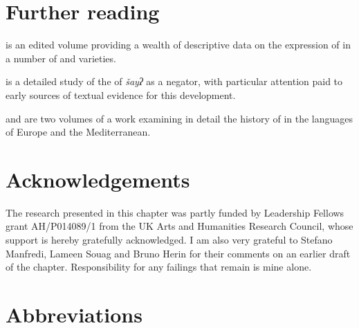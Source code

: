 \documentclass[output=paper]{langsci/langscibook}
\begin{document}
\section*{Further reading}
\begin{furtherreading}
\item[\citet{ChakerCaubet1996}] is an edited volume providing a wealth of descriptive data on the expression of  in a number of  and   varieties.
\item[\citet{Diem2014}] is a detailed study of the  of  \textit{šayʔ} as a negator, with particular attention paid to early sources of textual evidence for this development.
\item[\citet{WillisBreitbarth2013}] and \citet{BreitbarthWillisLucasinpress} are two volumes of a work examining in detail the history of  in the languages of Europe and the Mediterranean.
\end{furtherreading}

\section*{Acknowledgements}

The research presented in this chapter was partly funded by Leadership Fellows grant AH/P014089/1 from the UK Arts and Humanities Research Council, whose support is hereby gratefully acknowledged. I am also very grateful to Stefano Manfredi, Lameen Souag and Bruno Herin for their comments on an earlier draft of the chapter. Responsibility for any failings that remain is mine alone.

\section*{Abbreviations}
\end{document}
